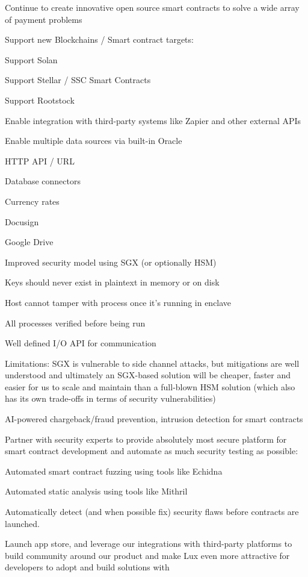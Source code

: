 \documentclass[11pt]{article}
\begin{document}
Continue to create innovative open source smart contracts to solve a wide array of payment problems


Support new Blockchains / Smart contract targets:


Support Solan


Support Stellar / SSC Smart Contracts


Support Rootstock


Enable integration with third-party systems like Zapier and other external APIs


Enable multiple data sources via built-in Oracle


HTTP API / URL


Database connectors


Currency rates


Docusign


Google Drive


Improved security model using SGX (or optionally HSM)


Keys should never exist in plaintext in memory or on disk


Host cannot tamper with process once it's running in enclave


All processes verified before being run


Well defined I/O API for communication


Limitations: SGX is vulnerable to side channel attacks, but mitigations are well understood and ultimately an SGX-based solution will be cheaper, faster and easier for us to scale and maintain than a full-blown HSM solution (which also has its own trade-offs in terms of security vulnerabilities)


AI-powered chargeback/fraud prevention, intrusion detection for smart contracts


Partner with security experts to provide absolutely most secure platform for smart contract development and automate as much security testing as possible:


Automated smart contract fuzzing using tools like Echidna


Automated static analysis using tools like Mithril


Automatically detect (and when possible fix) security flaws before contracts are launched.


Launch app store, and leverage our integrations with third-party platforms to build community around our product and make Lux even more attractive for developers to adopt and build solutions with
\end{document}

